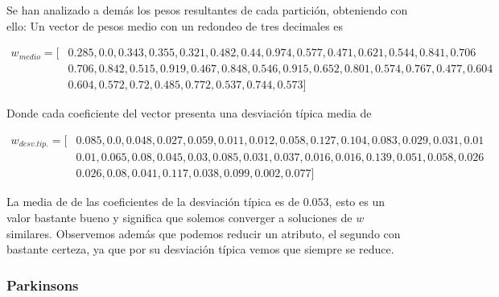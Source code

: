 Se han analizado a demás los pesos resultantes de cada partición, obteniendo con ello: 
Un vector de pesos medio con un redondeo de tres decimales es 

\begin{align*}
w_{medio} = [  
&  0.285, 0.0, 0.343, 0.355, 0.321, 0.482, 0.44, 0.974, 0.577, 0.471, 0.621, 0.544, 0.841, 0.706  \\
&  0.706, 0.842, 0.515, 0.919, 0.467, 0.848, 0.546, 0.915, 0.652, 0.801, 0.574, 0.767, 0.477, 0.604  \\
&  0.604, 0.572, 0.72, 0.485, 0.772, 0.537, 0.744, 0.573 
 ]
\end{align*}

Donde cada coeficiente del vector presenta una desviación típica media de 

\begin{align*}
  w_{desv. tip.} = [ 
    &  0.085, 0.0, 0.048, 0.027, 0.059, 0.011, 0.012, 0.058, 0.127, 0.104, 0.083, 0.029, 0.031, 0.01  \\
    &  0.01, 0.065, 0.08, 0.045, 0.03, 0.085, 0.031, 0.037, 0.016, 0.016, 0.139, 0.051, 0.058, 0.026  \\
    &  0.026, 0.08, 0.041, 0.117, 0.038, 0.099, 0.002, 0.077 
   ]
  \end{align*}

  La media de de las coeficientes de la desviación típica es de $0.053$, esto es un valor bastante bueno y significa que solemos converger a soluciones de $w$ similares. 
  Observemos además que podemos reducir un atributo, el segundo con bastante certeza, ya que por su desviación típica vemos que siempre se reduce. 




  \subsubsection{Parkinsons} 

